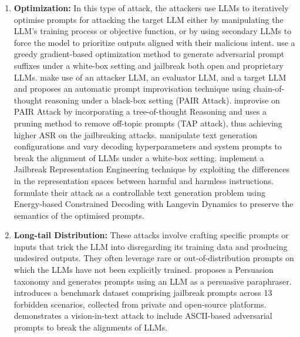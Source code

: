  \begin{enumerate}[label=(\alph*)]
    
    \item \textbf{Optimization:} \label{optimization} In this type of attack, the attackers use LLMs to iteratively optimise prompts for attacking the target LLM either by manipulating the LLM's training process or objective function, or by using secondary LLMs to force the model to prioritize outputs aligned with their malicious intent. \citet{zou2023universal} use a greedy gradient-based optimization method to generate adversarial prompt suffixes under a white-box setting and jailbreak both open and proprietary LLMs. \citet{pair23} make use of an attacker LLM, an evaluator LLM, and a target LLM and proposes an automatic prompt improvisation technique using chain-of-thought reasoning under a black-box setting (PAIR Attack). \citet{tap23} improvise on PAIR Attack by incorporating a tree-of-thought Reasoning and uses a pruning method to remove off-topic prompts (TAP attack), thus achieving higher ASR on the jailbreaking attacks. \citet{huang2023catastrophic} manipulate text generation configurations and vary decoding hyperparameters and system prompts to break the alignment of LLMs under a white-box setting. \citet{li2024open} implement a Jailbreak Representation Engineering technique by exploiting the differences in the representation spaces between harmful and harmless instructions. \citet{guo2024jailbreaking} formulate their attack as a controllable text generation problem using Energy-based Constrained Decoding with Langevin Dynamics to preserve the semantics of the optimised prompts.
   
    \item \textbf{Long-tail Distribution: }
    \label{long}
   These attacks involve crafting specific prompts or inputs that trick the LLM into disregarding its training data and producing undesired outputs. They often leverage rare or out-of-distribution prompts on which the LLMs have not been explicitly trained. \citet{johnny24} proposes a Persuasion taxonomy and generates prompts using an LLM as a persuasive paraphraser. \citet{dan23} introduces a benchmark dataset comprising jailbreak prompts across 13 forbidden scenarios, collected from private and open-source platforms. \citet{ascii24} demonstrates a vision-in-text attack to include ASCII-based adversarial prompts to break the alignments of LLMs.
    \end{enumerate}
 
